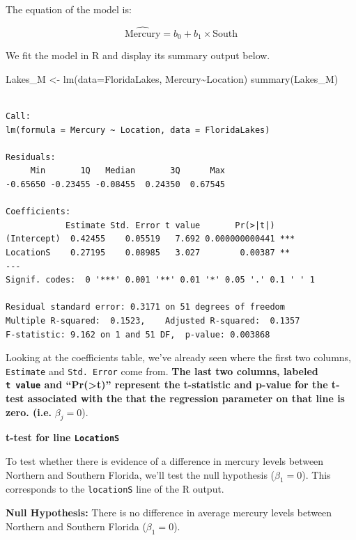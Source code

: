 \documentclass[
  letterpaper,
  DIV=11,
  numbers=noendperiod]{scrreprt}
\newenvironment{Shaded}{\begin{snugshade}}{\end{snugshade}}
\newcommand{\AttributeTok}[1]{\textcolor[rgb]{0.40,0.45,0.13}{#1}}
\newcommand{\FunctionTok}[1]{\textcolor[rgb]{0.28,0.35,0.67}{#1}}
\newcommand{\NormalTok}[1]{\textcolor[rgb]{0.00,0.23,0.31}{#1}}
\newcommand{\OtherTok}[1]{\textcolor[rgb]{0.00,0.23,0.31}{#1}}
\newcommand{\SpecialCharTok}[1]{\textcolor[rgb]{0.37,0.37,0.37}{#1}}
\begin{document}
The equation of the model is:

\[
\widehat{\text{Mercury}} = b_0+b_1\times\text{South}
\]

We fit the model in R and display its summary output below.

\begin{Shaded}
\begin{Highlighting}[]
\NormalTok{Lakes\_M }\OtherTok{\textless{}{-}} \FunctionTok{lm}\NormalTok{(}\AttributeTok{data=}\NormalTok{FloridaLakes, Mercury}\SpecialCharTok{\textasciitilde{}}\NormalTok{Location)}
\FunctionTok{summary}\NormalTok{(Lakes\_M)}
\end{Highlighting}
\end{Shaded}

\begin{verbatim}

Call:
lm(formula = Mercury ~ Location, data = FloridaLakes)

Residuals:
     Min       1Q   Median       3Q      Max 
-0.65650 -0.23455 -0.08455  0.24350  0.67545 

Coefficients:
            Estimate Std. Error t value       Pr(>|t|)    
(Intercept)  0.42455    0.05519   7.692 0.000000000441 ***
LocationS    0.27195    0.08985   3.027        0.00387 ** 
---
Signif. codes:  0 '***' 0.001 '**' 0.01 '*' 0.05 '.' 0.1 ' ' 1

Residual standard error: 0.3171 on 51 degrees of freedom
Multiple R-squared:  0.1523,    Adjusted R-squared:  0.1357 
F-statistic: 9.162 on 1 and 51 DF,  p-value: 0.003868
\end{verbatim}

Looking at the coefficients table, we've already seen where the first
two columns, \texttt{Estimate} and \texttt{Std.\ Error} come from.
\textbf{The last two columns, labeled \texttt{t\ value} and
``Pr(\textgreater\textbar t\textbar)'' represent the t-statistic and
p-value for the t-test associated with the that the regression parameter
on that line is zero. (i.e.} \(\beta_j=0\)).

\textbf{t-test for line \texttt{LocationS}}

To test whether there is evidence of a difference in mercury levels
between Northern and Southern Florida, we'll test the null hypothesis
(\(\beta_1=0\)). This corresponds to the \texttt{locationS} line of the
R output.

\textbf{Null Hypothesis:} There is no difference in average mercury
levels between Northern and Southern Florida (\(\beta_1=0\)).
\end{document}
